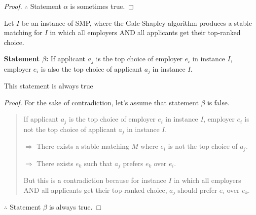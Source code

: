 \documentclass[11pt,fleqn]{exam}
\newif\ifsolutions\solutionsfalse
\newenvironment{soln}{\color{solnblue}}{}
\begin{document}
\begin{questions}
\begin{soln}
\begin{proof}
	$\therefore$ Statement $\alpha$ is sometimes true.
	\end{proof}
\end{soln}

\ifsolutions

\else
\fi
    
\question[2]
Let $I$ be an instance of SMP, where the Gale-Shapley algorithm produces a stable matching for $I$ in which all employers AND all applicants get their top-ranked choice. 

\noindent
{\bf Statement $\beta$:}  
If applicant $a_j$ is the top choice of employer $e_i$ in instance $I$, employer $e_i$ is also the top choice of applicant $a_j$ in instance $I$.

\begin{soln}
	This statement is always true
	\begin{proof}
		For the sake of contradiction, let's assume that statement $\beta$ is false.

		\begin{quotation}
			If applicant $a_j$ is the top choice of employer $e_i$ in instance $I$,
			 employer $e_i$ is not the top choice of applicant $a_j$ in instance $I$.
			
			$\Rightarrow$ There exists a stable matching $M$ where $e_i$ is not the top choice of $a_j$.

			$\Rightarrow$ There exists $e_k$ such that $a_j$ prefers $e_k$ over $e_i$.

			But this is a contradiction because for instance $I$ in 
			which all employers AND all applicants get their top-ranked choice, $a_j$ should prefer $e_i$ over $e_k$.
		\end{quotation}
		$\therefore$ Statement $\beta$ is always true.
	
	\end{proof}
\end{soln}

\ifsolutions

\else
\fi
\end{questions}

    
\end{document}
